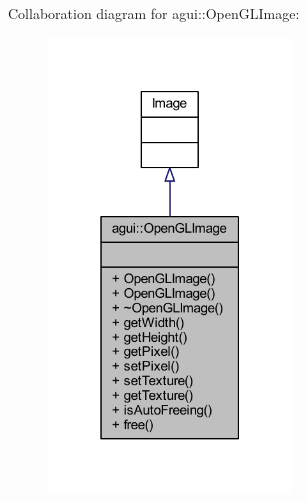 Collaboration diagram for agui\+:\+:Open\+G\+L\+Image\+:\nopagebreak
\begin{figure}[H]
\begin{center}
\leavevmode
\includegraphics[width=183pt]{classagui_1_1_open_g_l_image__coll__graph}
\end{center}
\end{figure}

